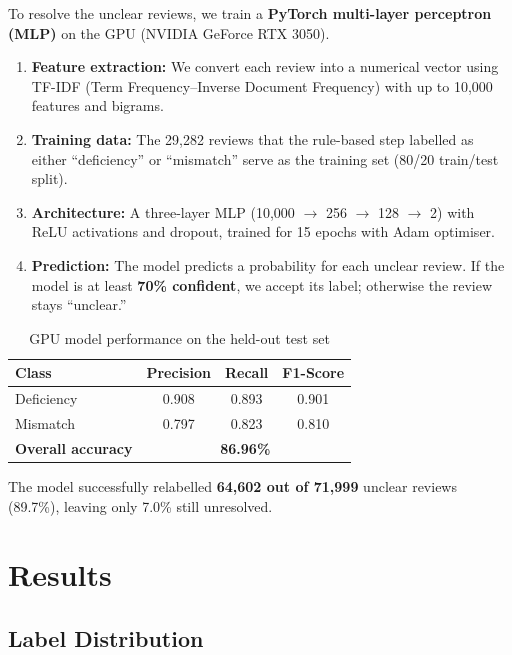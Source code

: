 \documentclass[12pt,a4paper]{article}
\begin{document}
To resolve the unclear reviews, we train a \textbf{PyTorch multi-layer perceptron (MLP)} on the GPU (NVIDIA GeForce RTX 3050).

\begin{enumerate}[nosep]
    \item \textbf{Feature extraction:} We convert each review into a numerical vector using TF-IDF (Term Frequency--Inverse Document Frequency) with up to 10,000 features and bigrams.
    \item \textbf{Training data:} The 29,282 reviews that the rule-based step labelled as either ``deficiency'' or ``mismatch'' serve as the training set (80/20 train/test split).
    \item \textbf{Architecture:} A three-layer MLP (10,000 $\rightarrow$ 256 $\rightarrow$ 128 $\rightarrow$ 2) with ReLU activations and dropout, trained for 15 epochs with Adam optimiser.
    \item \textbf{Prediction:} The model predicts a probability for each unclear review. If the model is at least \textbf{70\% confident}, we accept its label; otherwise the review stays ``unclear.''
\end{enumerate}

\begin{table}[H]
\centering
\caption{GPU model performance on the held-out test set}
\begin{tabular}{lccc}
\toprule
\textbf{Class} & \textbf{Precision} & \textbf{Recall} & \textbf{F1-Score} \\
\midrule
Deficiency & 0.908 & 0.893 & 0.901 \\
Mismatch   & 0.797 & 0.823 & 0.810 \\
\midrule
\textbf{Overall accuracy} & \multicolumn{3}{c}{\textbf{86.96\%}} \\
\bottomrule
\end{tabular}
\end{table}

The model successfully relabelled \textbf{64,602 out of 71,999} unclear reviews (89.7\%), leaving only 7.0\% still unresolved.

\section{Results}

\subsection{Label Distribution}
\end{document}
